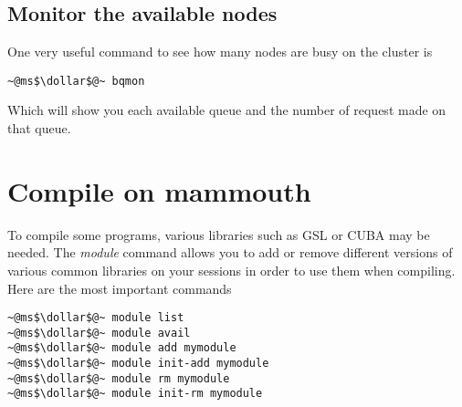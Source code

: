 \documentclass[10pt,letter]{article}
\newcommand{\dollar}{\mbox{\textdollar}}
\begin{document}
\subsection{Monitor the available nodes}
One very useful command to see how many nodes are busy on the cluster is 
\begin{bashInput}
\begin{lstlisting}[style=BashInputStyle]
~@ms$\dollar$@~ bqmon
\end{lstlisting}
\end{bashInput}
Which will show you each available queue and the number of request made on that queue.

\section{Compile on mammouth}

To compile some programs, various libraries such as GSL or CUBA may be needed. The \emph{module} command allows you to  add or remove different versions of various common libraries on your sessions in order to use them when compiling. Here are the most important commands
\begin{bashInput}
\begin{lstlisting}[style=BashInputStyle]
~@ms$\dollar$@~ module list
~@ms$\dollar$@~ module avail
~@ms$\dollar$@~ module add mymodule
~@ms$\dollar$@~ module init-add mymodule
~@ms$\dollar$@~ module rm mymodule
~@ms$\dollar$@~ module init-rm mymodule
\end{lstlisting}
\end{bashInput}
\end{document}
